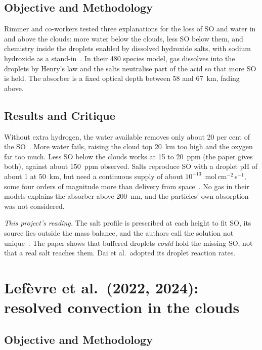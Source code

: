 \subsection{Objective and Methodology}

Rimmer and co-workers tested three explanations for the loss of SO and water in
and above the clouds: more water below the clouds, less SO below them, and
chemistry inside the droplets enabled by dissolved hydroxide salts, with sodium hydroxide
as a stand-in~\cite{rimmer2021}. In their 480 species model, gas dissolves into the
droplets by Henry's law and the salts neutralise part of the acid so that more SO
is held. The absorber is a fixed optical depth between 58 and 67~km, fading above.

\subsection{Results and Critique}

Without extra hydrogen, the water available removes only about 20 per cent of the
SO~\cite{rimmer2021}. More water fails, raising the cloud top 20~km too high and
the oxygen far too much. Less SO below the clouds works at 15 to 20~ppm (the paper
gives both), against about 150~ppm observed. Salts reproduce SO with a droplet pH
of about 1 at 50~km, but need a continuous supply of about
$10^{-13}$~mol\,cm$^{-2}$\,s$^{-1}$, some four orders of magnitude more than delivery
from space~\cite{rimmer2021}. No gas in their models explains the absorber above 200~nm,
and the particles' own absorption was not considered.

\emph{This project's reading.} The salt profile is prescribed at each height to fit
SO, its source lies outside the mass balance, and the authors call the solution not
unique~\cite{rimmer2021}. The paper shows that buffered droplets \emph{could} hold the
missing SO, not that a real salt reaches them. Dai et al.\ adopted its droplet
reaction rates.

\section{Lef\`evre et al.\ (2022, 2024): resolved convection in the clouds}
\label{sec:lit-lef}

\subsection{Objective and Methodology}

